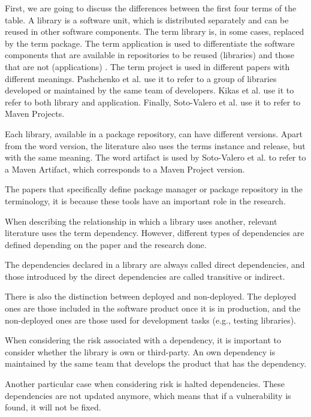 \blankls
First, we are going to discuss the differences between the first four terms of the table. A library is a software unit, which is distributed separately and can be reused in other software components. The term library is, in some cases, replaced by the term package. The term application is used to differentiate the software components that are available in repositories to be reused (libraries) and those that are not (applications) \cite{kikas2017structure}.
The term project is used in different papers with different meanings. Pashchenko et al. \cite{pashchenko2018vulnerable} use it to refer to a group of libraries developed or maintained by the same team of developers. Kikas et al. \cite{kikas2017structure} use it to refer to both library and application. Finally, Soto-Valero et al. use it to refer to Maven Projects.

Each library, available in a package repository, can have different versions. Apart from the word version, the literature also uses the terms instance and release, but with the same meaning. The word artifact is used by Soto-Valero et al. to refer to a Maven Artifact, which corresponds to a Maven Project version.

The papers that specifically define package manager or package repository in the terminology, it is because these tools have an important role in the research.

When describing the relationship in which a library uses another, relevant literature uses the term dependency. However, different types of dependencies are defined depending on the paper and the research done.

The dependencies declared in a library are always called direct dependencies, and those introduced by the direct dependencies are called transitive or indirect.

There is also the distinction between deployed and non-deployed. The deployed ones are those included in the software product once it is in production, and the non-deployed ones are those used for development tasks (e.g., testing libraries).

When considering the risk associated with a dependency, it is important to consider whether the library is own or third-party. An own dependency is maintained by the same team that develops the product that has the dependency.

Another particular case when considering risk is halted dependencies. These dependencies are not updated anymore, which means that if a vulnerability is found, it will not be fixed.

